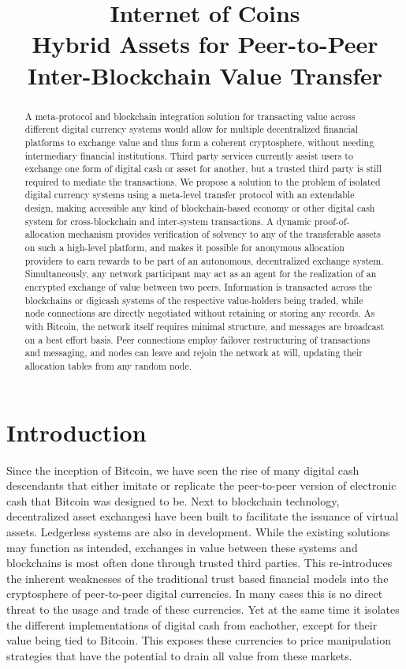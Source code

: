 \documentclass[a4paper]{article}
\title{Internet of Coins\\[6mm]
\small{Hybrid Assets for Peer-to-Peer Inter-Blockchain Value Transfer}
}
\begin{document}
\maketitle

\begin{abstract}
 A meta-protocol and blockchain integration solution for transacting value across different digital currency systems would allow for multiple decentralized financial platforms to exchange value and thus form a coherent cryptosphere, without needing intermediary financial institutions. Third party services currently assist users to exchange one form of digital cash or asset for another, but a trusted third party is still required to mediate the transactions. We propose a solution to the problem of isolated digital currency systems using a meta-level transfer protocol with an extendable design, making accessible any kind of blockchain-based economy or other digital cash system for cross-blockchain and inter-system transactions. A dynamic proof-of-allocation mechanism provides verification of solvency to any of the transferable assets on such a high-level platform, and makes it possible for anonymous allocation providers to earn rewards to be part of an autonomous, decentralized exchange system. Simultaneously, any network participant may act as an agent for the realization of an encrypted exchange of value between two peers. Information is transacted across the blockchains or digicash systems of the respective value-holders being traded, while node connections are directly negotiated without retaining or storing any records. As with Bitcoin, the network itself requires minimal structure, and messages are broadcast on a best effort basis. Peer connections employ failover restructuring of transactions and messaging, and nodes can leave and rejoin the network at will, updating their allocation tables from any random node.
\end{abstract}

\section{Introduction}
Since the inception of Bitcoin, we have seen the rise of many digital cash descendants that either imitate or replicate the peer-to-peer version of electronic cash that Bitcoin was designed to be. Next to blockchain technology, decentralized asset exchangesi have been built to facilitate the issuance of virtual assets. Ledgerless \cite{opentransactions} systems are also in development. While the existing solutions may function as intended, exchanges in value between these systems and blockchains is most often done through trusted third parties. This re-introduces the inherent weaknesses of the traditional trust based financial models into the cryptosphere of peer-to-peer digital currencies. In many cases this is no direct threat to the usage and trade of these currencies. Yet at the same time it isolates the different implementations of digital cash from eachother, except for their value being tied to Bitcoin. This exposes these currencies to price manipulation strategies that have the potential to drain all value from these markets. \cite{panture}
\end{document}
